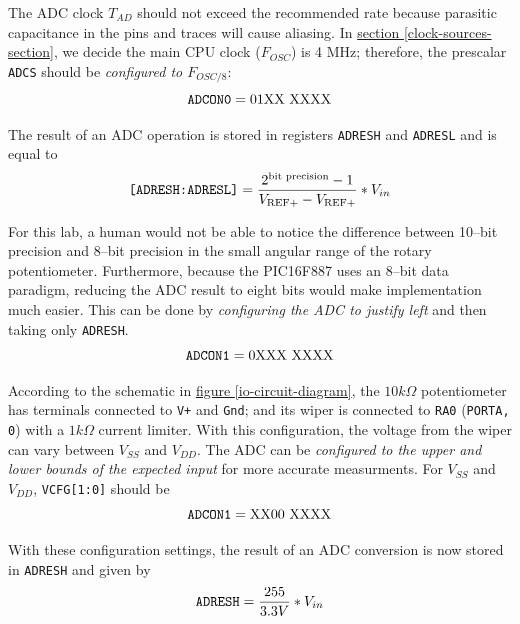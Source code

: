 \documentclass[11pt]{article}
\begin{document}
The ADC clock $T_{AD}$ should not exceed the recommended rate because parasitic
capacitance in the pins and traces will cause aliasing.
In \hyperref[clock-sources-section]{section \ref{clock-sources-section}},
we decide the main CPU clock ($F_{OSC}$) is 4 MHz;
therefore, the prescalar \texttt{ADCS} should be
\emph{configured to $F_{OSC/8}$}:
\begin{equation*}
\textrm{\texttt{ADCON0}}=\textrm{01XX XXXX}
\end{equation*}

The result of an ADC operation is stored in registers \texttt{ADRESH} and
\texttt{ADRESL} and is equal to
\begin{equation*}
\textrm{\texttt{[ADRESH:ADRESL]}}=\frac{2^{\textrm{bit precision}}-1}{V_{\textrm{REF+}}-V_{\textrm{REF+}}}*V_{in}
\end{equation*}

For this lab, a human would not be able to notice the difference between 10--bit precision
and 8--bit precision in the small angular range of the rotary potentiometer.
Furthermore, because the PIC16F887 uses an 8--bit data paradigm,
reducing the ADC result to eight bits would make implementation much easier.
This can be done by \emph{configuring the ADC to justify left} and then taking only \texttt{ADRESH}.
\begin{equation*}
\textrm{\texttt{ADCON1}}=\textrm{0XXX XXXX}
\end{equation*}

According to the schematic in \hyperref[io-circuit-diagram]{figure \ref{io-circuit-diagram}},
the $10k\Omega$ potentiometer has terminals connected to \texttt{V+} and \texttt{Gnd};
and its wiper is connected to \texttt{RA0} (\texttt{PORTA, 0}) with a $1k\Omega$ current limiter.
With this configuration, the voltage from the wiper can vary between $V_{SS}$ and $V_{DD}$.
The ADC can be \emph{configured to the upper and lower bounds of the expected input} for
more accurate measurments. For $V_{SS}$ and $V_{DD}$, \texttt{VCFG[1:0]} should be
\begin{equation*}
\textrm{\texttt{ADCON1}}=\textrm{XX00 XXXX}
\end{equation*}

With these configuration settings, the result of an ADC conversion is now stored in
\texttt{ADRESH} and given by
\begin{equation*}
\textrm{\texttt{ADRESH}}=\frac{255}{3.3V}*V_{in}
\end{equation*}
\end{document}
